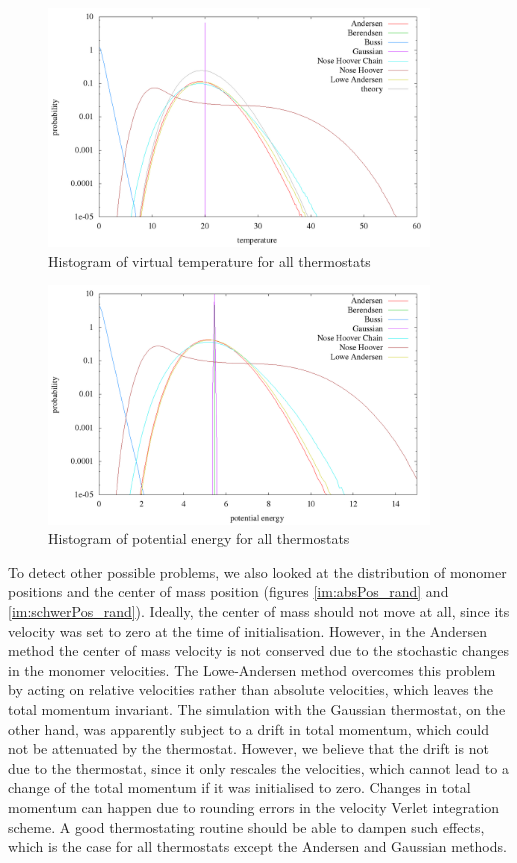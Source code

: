 \begin{figure}[H]
\centering
\includegraphics[width=0.9\textwidth]{./graphics/Histogramm_tempCol_rand_T=20_p=64.png}
\caption{Histogram of virtual temperature for all thermostats}
\label{im:temp_rand}
\end{figure}

\begin{figure}[H]
\centering
\includegraphics[width=0.9\textwidth]{./graphics/Histogramm_epot_rand_T=20_p=64.png}
\caption{Histogram of potential energy for all thermostats}
\label{im:epot_rand}
\end{figure}

To detect other possible problems, we also looked at the distribution of monomer positions and the center of mass position (figures \ref{im:absPos_rand} and \ref{im:schwerPos_rand}). Ideally, the center of mass should not move at all, since its velocity was set to zero at the time of initialisation. However, in the Andersen method the center of mass velocity is not conserved due to the stochastic changes in the monomer velocities. The Lowe-Andersen method overcomes this problem by acting on relative velocities rather than absolute velocities, which leaves the total momentum invariant. 
The simulation with the Gaussian thermostat, on the other hand, was apparently subject to a drift in total momentum, which could not be attenuated by the thermostat. However, we believe that the drift is not due to the thermostat, since it only rescales the velocities, which cannot lead to a change of the total momentum if it was initialised to zero. Changes in total momentum can happen due to rounding errors in the velocity Verlet integration scheme. A good thermostating routine should be able to dampen such effects, which is the case for all thermostats except the Andersen and Gaussian methods.       

